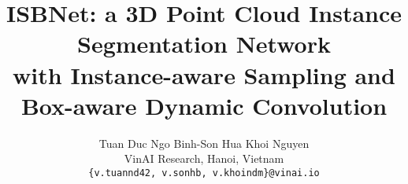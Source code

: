 \documentclass[10pt,twocolumn,letterpaper]{article}
\begin{document}



\newcommand{\khoi}[1]{\textcolor{mydarkblue}{[Khoi: #1]}}
\newcommand{\tuan}[1]{\textcolor{mydarkgreen}{[Tuan: #1]}}
\newcommand{\son}[1]{\textcolor{myred}{[Son: #1]}}


\title{ISBNet: a 3D Point Cloud Instance Segmentation Network \\ with Instance-aware Sampling and Box-aware Dynamic Convolution}

\author{Tuan Duc Ngo \qquad Binh-Son Hua \qquad Khoi Nguyen\\
VinAI Research, Hanoi, Vietnam\\
{\tt\small \{v.tuannd42, v.sonhb, v.khoindm\}@vinai.io}
}
\end{document}
